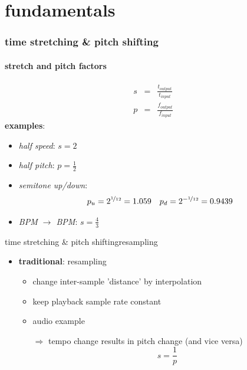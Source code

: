 \section[basics]{fundamentals}
\begin{frame}\frametitle{time stretching \& pitch shifting}\framesubtitle{stretch and pitch factors}
	\begin{eqnarray*}
		s	&=& \frac{t_{output}}{t_{input}}\\
		p	&=& \frac{f_{output}}{f_{input}}
	\end{eqnarray*}
	\pause
	\textbf{examples}:
	\begin{itemize}
		\item	\textit{half speed}: 
			\pause
			$s = 2$
		\pause
		\item	\textit{half pitch}: 
			\pause
			$p = \frac{1}{2}$
		\pause
		\item	\textit{semitone up/down}: 
			\pause
			\begin{equation}
				p_u = 2^{\nicefrac{1}{12}} = 1.059\quad p_d = 2^{-\nicefrac{1}{12}} = 0.9439\nonumber
			\end{equation}
		\pause
		\item	\textit{\unit[100]{BPM} $\rightarrow$ \unit[75]{BPM}}: 
			\pause
			$s = \frac{4}{3}$
	\end{itemize}
\end{frame}
    \begin{frame}{time stretching \& pitch shifting}{resampling}
        \begin{itemize}
            \item   \textbf{traditional}: resampling
                \begin{itemize}
                    \item   change inter-sample 'distance' by interpolation
                    \item   keep playback sample rate constant
                    \pause
                    \bigskip
                    \item   audio example
                    \pause
                    \bigskip 
                    \item[$\Rightarrow$] tempo change results in pitch change (and vice versa)
                    \begin{equation*}
                        s = \frac{1}{p}
                    \end{equation*}
                \end{itemize}
        \end{itemize}
    \end{frame}
 
